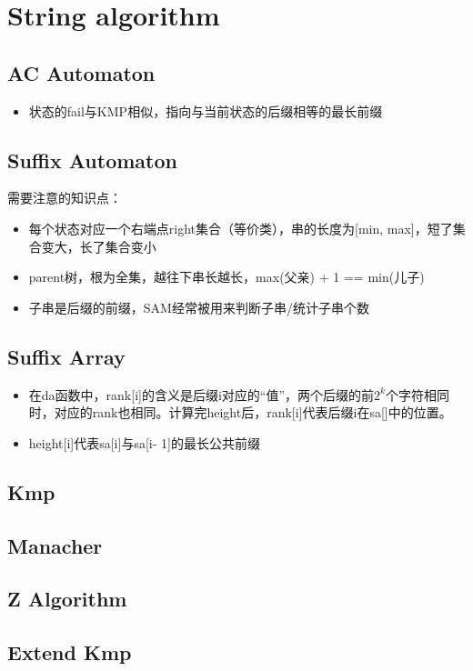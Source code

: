 \section{String algorithm}
	\subsection{AC Automaton}
		\begin{itemize}
			\item 状态的fail与KMP相似，指向与当前状态的后缀相等的最长前缀
		\end{itemize}
		
	\subsection{Suffix Automaton}
		\begin{flushleft}
			需要注意的知识点：
			\begin{itemize}
				\item 每个状态对应一个右端点right集合（等价类），串的长度为[min, max]，短了集合变大，长了集合变小
				\item parent树，根为全集，越往下串长越长，max(父亲) + 1 == min(儿子)
				\item 子串是后缀的前缀，SAM经常被用来判断子串/统计子串个数
			\end{itemize}
		\end{flushleft}
		
	\subsection{Suffix Array}
		\begin{flushleft}
			\begin{itemize}
				\item 在da函数中，rank[i]的含义是后缀i对应的“值”，两个后缀的前$2^k$个字符相同时，对应的rank也相同。计算完height后，rank[i]代表后缀i在sa[]中的位置。
				\item height[i]代表sa[i]与sa[i- 1]的最长公共前缀
			\end{itemize}
		\end{flushleft}
		
	\subsection{Kmp}
		
	\subsection{Manacher}
		
	\subsection{Z Algorithm}
		
	\subsection{Extend Kmp}
		